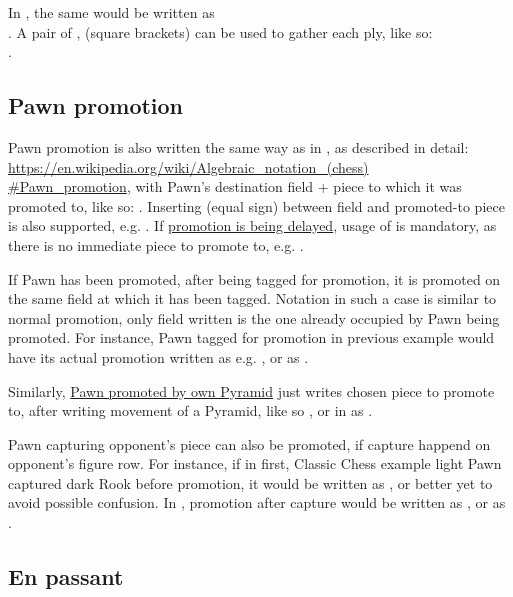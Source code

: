 In , the same would be written as \\
. A pair of \alg{[}, \alg{]} (square brackets) can be used
to gather each ply, like so: \\
\alg{[Qk2-f7]\~{}[Af7-i7]\~{}[Ai7-i9]}.

\subsection*{Pawn promotion}
\label{sec:Appendix/Notation/Pawn promotion}

Pawn promotion is also written the same way as in , as described in detail: \\
\href{https://en.wikipedia.org/wiki/Algebraic\_notation\_(chess)\#Pawn\_promotion}{https://en.wikipedia.org/wiki/Algebraic\_notation\_(chess)\\
\#Pawn\_promotion}, with Pawn's destination field + piece to which it was promoted to,
like so: . Inserting \alg{=} (equal sign) between field and promoted-to piece
is also supported, e.g. .
If \hyperref[fig:scn_aoa_05_delayed_promo_pawn_2_moved]{promotion is being delayed}, usage
of \alg{=} is mandatory, as there is no immediate piece to promote to, e.g. .

If Pawn has been promoted, after being tagged for promotion, it is promoted on the same
field at which it has been tagged. Notation in such a case is similar to normal promotion,
only field written is the one already occupied by Pawn being promoted. For instance, Pawn
tagged for promotion in previous example would have its actual promotion written as e.g.
, or as .

Similarly, \hyperref[fig:scn_ma_05_promo_init]{Pawn promoted by own Pyramid} just writes
chosen piece to promote to, after writing movement of a Pyramid, like so ,
or in  as \alg{[Gl4-d8]\~{}[Ad8-h8=Q]}.

Pawn capturing opponent's piece can also be promoted, if capture happend on opponent's
figure row. For instance, if in first, Classic Chess example light Pawn captured dark
Rook before promotion, it would be written as , or better yet 
to avoid possible confusion. In , promotion after capture would be written
as , or as .

\subsection*{En passant}
\label{sec:Appendix/Notation/En passant}


